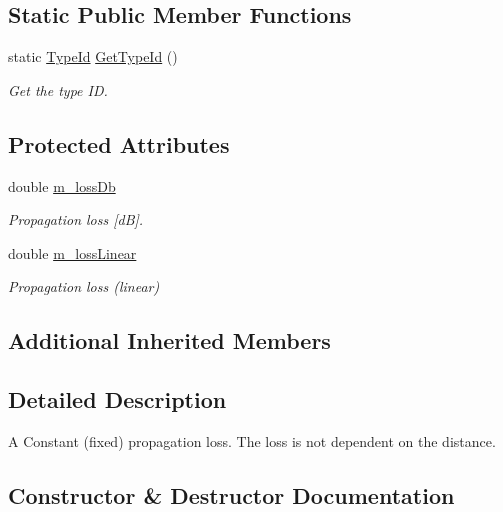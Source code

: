 \subsection*{Static Public Member Functions}
\begin{DoxyCompactItemize}
\item 
static \hyperlink{classns3_1_1TypeId}{Type\+Id} \hyperlink{classns3_1_1ConstantSpectrumPropagationLossModel_a09038841fadc65caad972014ed7274ba}{Get\+Type\+Id} ()
\begin{DoxyCompactList}\small\item\em Get the type ID. \end{DoxyCompactList}\end{DoxyCompactItemize}
\subsection*{Protected Attributes}
\begin{DoxyCompactItemize}
\item 
double \hyperlink{classns3_1_1ConstantSpectrumPropagationLossModel_a823aa80fb08a982e52ec6c0bb0fb369c}{m\+\_\+loss\+Db}
\begin{DoxyCompactList}\small\item\em Propagation loss \mbox{[}dB\mbox{]}. \end{DoxyCompactList}\item 
double \hyperlink{classns3_1_1ConstantSpectrumPropagationLossModel_ae11cc2f57fc332dd4c2cda8e665f3f0d}{m\+\_\+loss\+Linear}
\begin{DoxyCompactList}\small\item\em Propagation loss (linear) \end{DoxyCompactList}\end{DoxyCompactItemize}
\subsection*{Additional Inherited Members}


\subsection{Detailed Description}
A Constant (fixed) propagation loss. The loss is not dependent on the distance. 

\subsection{Constructor \& Destructor Documentation}
